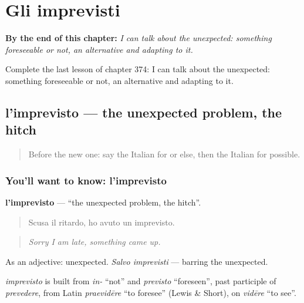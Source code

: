 
\chapter{Gli imprevisti}
\label{ch:it-gli-imprevisti}

\begin{chapteropening}
\textbf{By the end of this chapter:} \emph{I can talk about the unexpected: something foreseeable or not, an alternative and adapting to it.}

Complete the last lesson of chapter 374: I can talk about the unexpected: something foreseeable or not, an alternative and adapting to it.
\end{chapteropening}

\section[l'imprevisto]{l'imprevisto — the unexpected problem, the hitch}

\label{lesson:IT-C374-imprevisto}



\begin{quote}
Before the new one: say the Italian for or else, then the Italian for possible.
\end{quote}

\subsection*{You'll want to know: l'imprevisto}
\textbf{l'imprevisto} — \textquotedblleft{}the unexpected problem, the hitch\textquotedblright{}.

\begin{quote}
Scusa il ritardo, ho avuto un imprevisto.
\end{quote}

\begin{quote}
\emph{Sorry I am late, something came up.}
\end{quote}

As an adjective: unexpected. \emph{Salvo imprevisti} — barring the unexpected.

\begin{cousinweb}
\emph{imprevisto} is built from \emph{in-} \textquotedblleft{}not\textquotedblright{} and \emph{previsto} \textquotedblleft{}foreseen\textquotedblright{}, past participle of \emph{prevedere}, from Latin \emph{praevidēre} \textquotedblleft{}to foresee\textquotedblright{} (Lewis \& Short), on \emph{vidēre} \textquotedblleft{}to see\textquotedblright{}.
\end{cousinweb}

